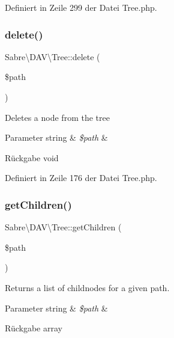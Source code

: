 Definiert in Zeile 299 der Datei Tree.\+php.

\mbox{\label{class_sabre_1_1_d_a_v_1_1_tree_abc6ad730a8061ab1fdcdc7a48a53f2ae}} 
\subsubsection{\texorpdfstring{delete()}{delete()}}
{\footnotesize\ttfamily Sabre\textbackslash{}\+D\+A\+V\textbackslash{}\+Tree\+::delete (\begin{DoxyParamCaption}\item[{}]{\$path }\end{DoxyParamCaption})}

Deletes a node from the tree


\begin{DoxyParams}[1]{Parameter}
string & {\em \$path} & \\
\hline
\end{DoxyParams}
\begin{DoxyReturn}{Rückgabe}
void 
\end{DoxyReturn}


Definiert in Zeile 176 der Datei Tree.\+php.

\mbox{\label{class_sabre_1_1_d_a_v_1_1_tree_a17a656c73d34b615ee94dda561906cdd}} 
\subsubsection{\texorpdfstring{get\+Children()}{getChildren()}}
{\footnotesize\ttfamily Sabre\textbackslash{}\+D\+A\+V\textbackslash{}\+Tree\+::get\+Children (\begin{DoxyParamCaption}\item[{}]{\$path }\end{DoxyParamCaption})}

Returns a list of childnodes for a given path.


\begin{DoxyParams}[1]{Parameter}
string & {\em \$path} & \\
\hline
\end{DoxyParams}
\begin{DoxyReturn}{Rückgabe}
array 
\end{DoxyReturn}


